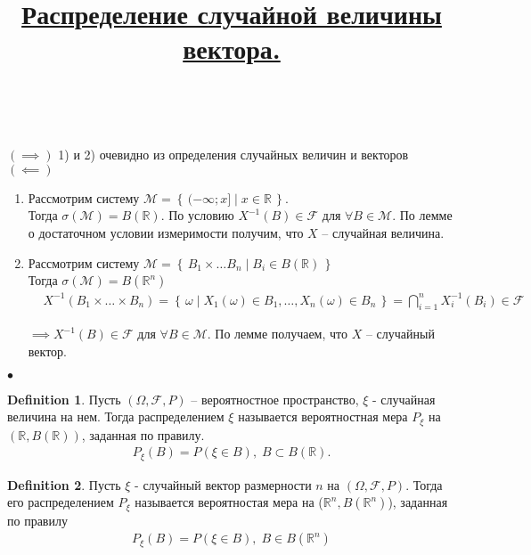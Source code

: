 \documentclass[a4paper]{article}
\theoremstyle{plain}
\theoremstyle{remark}
\theoremstyle{definition}
\newtheorem{definition}{Definition}
\renewenvironment{proof}{{\bfseries Proof}}{$\bullet$}
\newcommand{\setR}{\mathbb{R}}
\newcommand{\setRn}{\mathbb{R}^n}
\newcommand{\setM}{\mathcal{M}}
\newcommand{\setF}{\mathcal{F}}
\newcommand{\braces}[1]{\left\{ #1 \right\}} %
\newcommand{\condset}[2]{\braces{\, #1 \mid #2 \,}} %
\newcommand{\bigtitle}[1]{\title{\textbf{\underline{#1}}}}
\begin{document}
\begin{proof}~

  $(\implies)$ 1) и 2) очевидно из определения случайных величин и векторов\\

  $(\impliedby)$ \nolinebreak
  \begin{enumerate}
    \item 
      Рассмотрим систему $\setM = \condset{(-\infty; x]}{x \in \setR}$.\\
      Тогда  $\sigma(\setM) = B(\setR)$. По условию $X^{-1} (B) \in \setF$ для 
      $\forall B \in \setM$. По лемме о достаточном условии измеримости получим, 
      что $X$ -- случайная величина.

    \item 
      Рассмотрим систему $\setM = \condset{B_1 \times \ldots B_n}{B_i \in B(\setR)}$\\
      Тогда $\sigma(\setM) = B(\setRn)$
      \begin{align*}
        &X^{-1} (B_1 \times \ldots \times B_n) = 
        \condset{\omega}{X_1(\omega) \in B_1, \ldots, X_n(\omega) \in B_n}
        = \bigcap_{i = 1}^{n} X^{-1}_i (B_i) \in \setF
      \end{align*}

      $\implies X^{-1} (B) \in \setF$ для $\forall B \in \setM$. По лемме получаем, 
      что $X$ -- случайный вектор.
  \end{enumerate}

\end{proof}
\bigtitle{Распределение случайной величины вектора.}

\begin{definition}
  Пусть $(\Omega, \setF, P)$ -- вероятностное пространство, $\xi$ - случайная величина на нем. Тогда распределением $\xi$ называется вероятностная мера $P_\xi$ на $(\setR, B(\setR))$, заданная по правилу.
  \begin{align*}
    P_\xi (B) = P(\xi \in B),\; B \subset B(\setR).
  \end{align*}
\end{definition}

\begin{definition}
  Пусть $\xi$ - случайный вектор размерности $n$ на $(\Omega, \setF, P)$. 
  Тогда его распределением $P_\xi$ называется вероятностая мера на ($\setRn, B(\setRn)$), заданная по правилу
    \begin{align*}
      P_\xi (B) = P(\xi \in B),\; B \in B(\setRn)
    \end{align*}
\end{definition}
\end{document}
